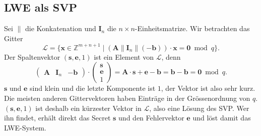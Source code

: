 \subsection{LWE als SVP}
Sei $\parallel$ die Konkatenation und $\mathbf{I}_n$ die $n \times n$-Einheitsmatrize. Wir betrachten das Gitter
\[
    \mathcal{L} = \{\mathbf{x} \in \mathbb{Z}^{m+n+1} \mid (\mathbf{A} \parallel \mathbf{I}_n \parallel (-\mathbf{b})) \cdot \mathbf{x} = \mathbf{0} \bmod q\}.
\]
Der Spaltenvektor $(\mathbf{s}, \mathbf{e}, 1)$ ist ein Element von $\mathcal{L}$, denn
\[
    \begin{pmatrix} \mathbf{A} & \mathbf{I}_n & -\mathbf{b} \end{pmatrix}
    \cdot
    \begin{pmatrix} \mathbf{s} \\ \mathbf{e} \\ 1 \end{pmatrix}
    = \mathbf{A} \cdot \mathbf{s} + \mathbf{e} - \mathbf{b} = \mathbf{b} - \mathbf{b} = \mathbf{0} \bmod q.
\]
$\mathbf{s}$ und $\mathbf{e}$ sind klein und die letzte Komponente ist $1$, der Vektor ist also sehr kurz. Die meisten anderen Gittervektoren haben Einträge in der Grössenordnung von $q$. $(\mathbf{s}, \mathbf{e}, 1)$ ist deshalb ein kürzester Vektor in $\mathcal{L}$, also eine Lösung des SVP. Wer ihn findet, erhält direkt das Secret $\mathbf{s}$ und den Fehlervektor $\mathbf{e}$ und löst damit das LWE-System.

